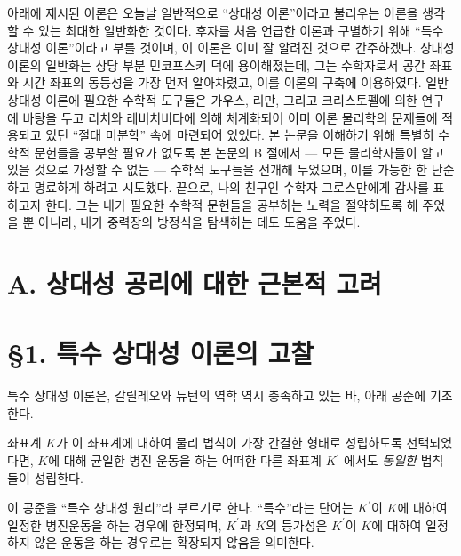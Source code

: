 \newcommand{\pderiv}[2]{{\frac{{\partial}{#1}}{{\partial}{#2}}}}
\newcommand{\ppderiv}[3]{{\frac{{\partial^2}{#1}}{{\partial}{#2}{\partial}{#3}}}}
\newcommand{\ilpderiv}[2]{{{{\partial}{#1}}/{{\partial}{#2}}}}
\newcommand{\ilppderiv}[3]{{\frac{{\partial^2}{#1}}/{{\partial}{#2}{\partial}{#3}}}}
\newcommand{\pppderiv}[4]{{\frac{{\partial^3}{#1}}{{\partial}{#2}{\partial}{#3}{\partial}{#4}}}}

\maketitle

아래에 제시된 이론은 오늘날 일반적으로 ``상대성 이론''이라고 불리우는 이론을 생각할 수 있는 최대한 일반화한 것이다. 후자를 처음 언급한 이론과 구별하기 위해 ``특수 상대성 이론''이라고 부를 것이며, 이 이론은 이미 잘 알려진 것으로 간주하겠다. 상대성 이론의 일반화는 상당 부분 민코프스키 덕에 용이해졌는데, 그는 수학자로서 공간 좌표와 시간 좌표의 동등성을 가장 먼저 알아차렸고, 이를 이론의 구축에 이용하였다. 
일반 상대성 이론에 필요한 수학적 도구들은 가우스, 리만, 그리고 크리스토펠에 의한 연구에 바탕을 두고 리치와 레비치비타에 의해 체계화되어 이미 이론 물리학의 문제들에 적용되고 있던 ``절대 미분학'' 속에 마련되어 있었다. 본 논문을 이해하기 위해 특별히 수학적 문헌들을 공부할 필요가 없도록 본 논문의 B 절에서 --- 모든 물리학자들이 알고 있을 것으로 가정할 수 없는 --- 수학적 도구들을 전개해 두었으며, 이를 가능한 한 단순하고 명료하게 하려고 시도했다. 
끝으로, 나의 친구인 수학자 그로스만에게 감사를 표하고자 한다. 그는 내가 필요한 수학적 문헌들을 공부하는 노력을 절약하도록 해 주었을 뿐 아니라, 내가 중력장의 방정식을 탐색하는 데도 도움을 주었다.

\section*{A. 상대성 공리에 대한 근본적 고려}
\section*{\S 1. 특수 상대성 이론의 고찰}
특수 상대성 이론은, 갈릴레오와 뉴턴의 역학 역시 충족하고 있는 바, 아래 공준에 기초한다.

좌표계 $K$가 이 좌표계에 대하여 물리 법칙이 가장 간결한 형태로 성립하도록 선택되었다면, $K$에 대해 균일한 병진 운동을 하는 어떠한 다른 좌표계 $K^\prime$ 에서도 \emph{동일한} 법칙들이 성립한다.

이 공준을 ``특수 상대성 원리''라 부르기로 한다. ``특수''라는 단어는 $K^{\prime}$이 $K$에 대하여  일정한 병진운동을 하는 경우에 한정되며, $K^{\prime}$과 $K$의 등가성은 $K^{\prime}$이 $K$에 대하여 일정하지 않은 운동을 하는 경우로는 확장되지 않음을 의미한다. 

